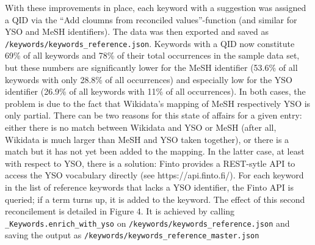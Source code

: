With these improvements in place, each keyword with a suggestion was
assigned a QID via the ``Add cloumns from reconciled values''-function
(and similar for YSO and MeSH identifiers). The data was then exported
and saved as \texttt{/keywords/keywords\_reference.json}. Keywords with
a QID now constitute 69\% of all keywords and 78\% of their total
occurrences in the sample data set, but these numbers are significantly
lower for the MeSH identifier (53.6\% of all keywords with only 28.8\%
of all occurrences) and especially low for the YSO identifier (26.9\% of
all keywords with 11\% of all occurrences). In both cases, the problem
is due to the fact that Wikidata's mapping of MeSH respectively YSO is
only partial. There can be two reasons for this state of affairs for a
given entry: either there is no match between Wikidata and YSO or MeSH
(after all, Wikidata is much larger than MeSH and YSO taken together),
or there is a match but it has not yet been added to the mapping. In the
latter case, at least with respect to YSO, there is a solution: Finto
provides a REST-sytle API to access the YSO vocabulary directly (see
https://api.finto.fi/). For each keyword in the list of reference
keywords that lacks a YSO identifier, the Finto API is queried; if a
term turns up, it is added to the keyword. The effect of this second
reconcilement is detailed in Figure 4. It is achieved by calling
\texttt{\_Keywords.enrich\_with\_yso} on
\texttt{/keywords/keywords\_reference.json} and saving the output as
\texttt{/keywords/keywords\_reference\_master.json}

\begin{Shaded}
\begin{Highlighting}[]
\OperatorTok{=}\OperatorTok{+} \NormalTok{)}
\OperatorTok{=}
\OperatorTok{+} \NormalTok{)}
\end{Highlighting}
\end{Shaded}

